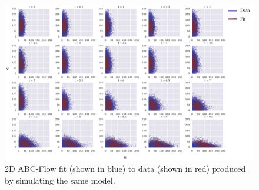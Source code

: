 
\begin{figure}[htbp]
\centering
\includegraphics[scale=0.7]{../../chapters/chapterABCFlow/images/2D_flow_time.pdf}
\caption[ABC-Flow parameter inference for 2D simulated data]{\label{fig:2d-sim-res}2D ABC-Flow fit (shown in blue) to data (shown in red) produced by simulating the same model. }
\end{figure}

%
%
%
%





